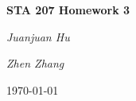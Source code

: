 \documentclass[12pt,a4paper]{report}
\begin{document}
\begin{titlepage}
	\centering
	{\huge\bfseries STA 207 Homework 3\par}
	\vspace{2cm}
	{\Large\itshape Juanjuan Hu\par}
	\vspace{1cm}
	{\Large\itshape Zhen Zhang\par}
	\vfill

	\vfill

	{\large \today\par}
\end{titlepage}
\end{document}
